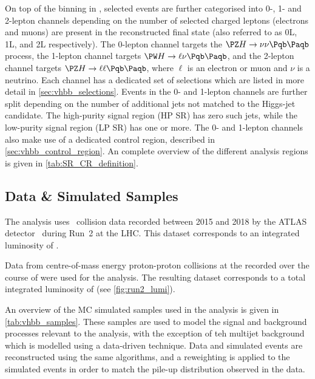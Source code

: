 On top of the binning in \ptv, selected events are further categorised into 0-, 1- and 2-lepton channels depending on the number of selected charged leptons (electrons and muons) are present in the reconstructed final state (also referred to as 0L, 1L, and 2L respectively).
The 0-lepton channel targets the $\Zboson \higgs \rightarrow \nu\nu \bbbar$ process, the 1-lepton channel targets $\Wboson \higgs \rightarrow \ell\nu \bbbar$, and the 2-lepton channel targets $\Zboson \higgs \rightarrow \ell\ell \bbbar$, where $\ell$ is an electron or muon and $\nu$ is a neutrino.
Each channel has a dedicated set of selections which are listed in more detail in \cref{sec:vhbb_selections}.
Events in the 0- and 1-lepton channels are further split depending on the number of additional \smallR jets
not matched to the Higgs-jet candidate.
The high-purity signal region (HP SR) has zero such jets, while the low-purity signal region (LP SR) has one or more.
The 0- and 1-lepton channels also make use of a dedicated \ttbar control region, described in \cref{sec:vhbb_control_region}.
An complete overview of the different analysis regions is given in \cref{tab:SR_CR_definition}.

%

%


\subsection{Data \& Simulated Samples}\label{sec:vhbb_samples}

The analysis uses \pp\ collision data recorded between 2015 and
2018 by the ATLAS detector~\cite{PERF-2007-01} during Run~2 at the
LHC. This dataset corresponds to an integrated luminosity
of \intlumi.

Data from centre-of-mass energy  proton-proton collisions at the \LHC recorded over the course of \runtwo were used for the analysis.
The resulting dataset corresponds to a total integrated luminosity of \intlumi (see \cref{fig:run2_lumi}).

An overview of the MC simulated samples used in the analysis is given in \cref{tab:vhbb_samples}.
These samples are used to model the signal and background processes relevant to the analysis, with the exception of teh multijet background which is modelled using a data-driven technique.
Data and simulated events are reconstructed using the same algorithms, and a reweighting is applied to the simulated events in order to match the pile-up distribution
observed in the data.
%

%

